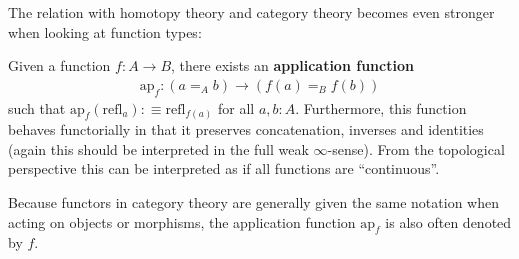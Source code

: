     The relation with homotopy theory and category theory becomes even stronger when looking at function types:
    \begin{property}
        Given a function $f:A\rightarrow B$, there exists an \textbf{application function}
        \begin{gather}
            \text{ap}_f:(a=_Ab)\rightarrow(f(a)=_Bf(b))
        \end{gather}
        such that $\text{ap}_f(\text{refl}_a):\equiv\text{refl}_{f(a)}$ for all $a,b:A$. Furthermore, this function behaves functorially in that it preserves concatenation, inverses and identities (again this should be interpreted in the full weak $\infty$-sense). From the topological perspective this can be interpreted as if all functions are ``continuous''.
    \end{property}
    \begin{notation}
        Because functors in category theory are generally given the same notation when acting on objects or morphisms, the application function $\text{ap}_f$ is also often denoted by $f$.
    \end{notation}

